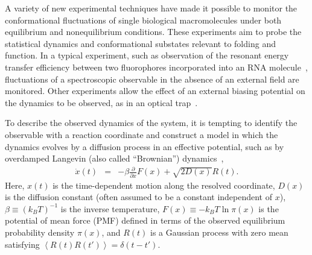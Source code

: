 \documentclass[aps,prl,twocolumn,superscriptaddress,floatfix]{revtex4-1}
\newcommand{\expect}[1]{\left \langle #1 \right \rangle}                %
\begin{document}
A variety of new experimental techniques have made it possible to monitor the conformational fluctuations of single biological macromolecules under both equilibrium and nonequilibrium conditions.
These experiments aim to probe the statistical dynamics and conformational substates relevant to folding and function.
In a typical experiment, such as observation of the resonant energy transfer efficiency between two fluorophores incorporated into an RNA molecule~\cite{scherer:jmb:2008:equilibrium}, fluctuations of a spectroscopic observable in the absence of an external field are monitored.
Other experiments allow the effect of an external biasing potential on the dynamics to be observed, as in an optical trap~\cite{woodside:prl:2005:optical-force-clamp,collin:biophys-j:2006:tar-rna-hopping,woodside:science:2006:dna-hairpin-optical-trap}.



To describe the observed dynamics of the system, it is tempting to identify the observable with a reaction coordinate and construct a model in which the dynamics evolves by a diffusion process in an effective potential, such as by overdamped Langevin (also called ``Brownian'') dynamics~\cite{gardiner:handbook-of-stochastic-methods},
\begin{eqnarray}
\dot{x}(t) &=& - \beta \frac{\partial}{\partial x}F(x) + \sqrt{2 D(x)} R(t) \label{equation:brownian-equation-of-motion} .
\end{eqnarray}
Here, $x(t)$ is the time-dependent motion along the resolved coordinate, $D(x)$ is the diffusion constant (often assumed to be a constant independent of $x$), 
$\beta \equiv (k_B T)^{-1}$ is the inverse temperature, $F(x) \equiv - k_B T\ln \pi(x)$ is the potential of mean force (PMF) defined in terms of the observed equilibrium probability density $\pi(x)$, and $R(t)$ is a Gaussian process with zero mean satisfying $\expect{R(t) R(t')} = \delta(t - t')$.
\end{document}
